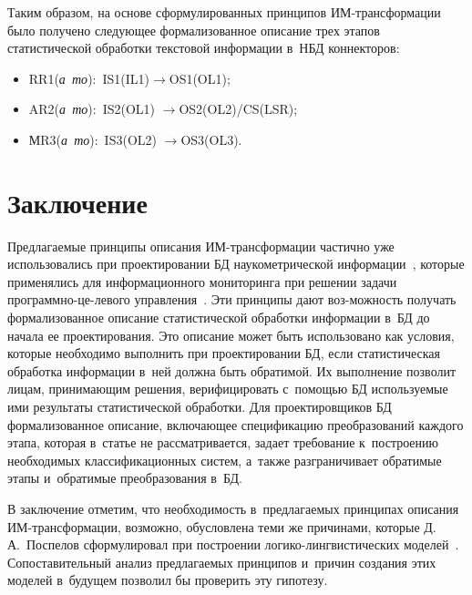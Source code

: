 \begin{multicols}{2}
   Таким образом, на основе сформулированных принципов  
ИМ-транс\-фор\-ма\-ции было получено сле\-ду\-ющее формализованное описание 
трех этапов ста\-ти\-сти\-че\-ской обработки текс\-то\-вой информации в~НБД кон\-нек\-то\-ров:
   \begin{itemize}
   \item RR1(\textit{а~то}):\ IS1(IL1)\;$\to$\;OS1(OL1);
   \item AR2(\textit{а~то}):\ IS2(OL1) \;$\to$\;OS2(OL2)/CS(LSR);
   \item МR3(\textit{а~то}):\ IS3(OL2) \;$\to$\;OS3(OL3).
   \end{itemize}
   
\section{Заключение}
   
   Предлагаемые принципы описания ИМ-транс\-фор\-ма\-ции час\-тич\-но уже 
использовались при проектировании БД нау\-ко\-мет\-ри\-че\-ской  
информации~\cite{13-zac, 14-zac, 15-zac, 16-zac}, которые применялись для 
\mbox{информационного} мониторинга при решении задачи про\-грам\-мно-це-\linebreak ле\-во\-го 
управ\-ле\-ния~\cite{17-zac}. Эти принципы дают воз-\linebreak мож\-ность получать 
формализованное описание ста\-ти\-сти\-че\-ской обработки информации в~БД до начала 
ее проектирования. Это описание может быть использовано как условия, которые 
необходимо выполнить при проектировании БД, если ста\-ти\-сти\-че\-ская обработка 
информации в~ней долж\-на быть обратимой. Их выполнение поз\-во\-лит лицам, 
при\-ни\-ма\-ющим решения, верифицировать с~по\-мощью БД ис\-поль\-зу\-емые ими 
результаты ста\-ти\-сти\-че\-ской обработки. Для проектировщиков БД 
формализованное описание, вклю\-ча\-ющее спецификацию преобразований каж\-до\-го 
этапа, которая в~\mbox{статье} не рас\-смат\-ри\-ва\-ет\-ся, задает требование к~по\-стро\-ению 
необходимых классификационных сис\-тем, а~так\-же разграничивает обратимые 
этапы и~обратимые преобразования в~БД.
   
   В заключение отметим, что необходимость в~пред\-ла\-га\-емых принципах 
описания ИМ-транс\-фор\-ма\-ции, воз\-мож\-но, обуслов\-ле\-на теми же причинами, 
которые Д.\,А.~Пос\-пе\-лов сформулировал при по\-стро\-ении  
ло\-ги\-ко-линг\-ви\-сти\-че\-ских моделей~\cite{18-zac}. Со\-по\-ста\-ви\-тель\-ный 
анализ пред\-ла\-га\-емых принципов и~причин создания этих моделей в~будущем 
поз\-во\-лил бы проверить эту ги\-по\-тезу.
   

\end{multicols}
